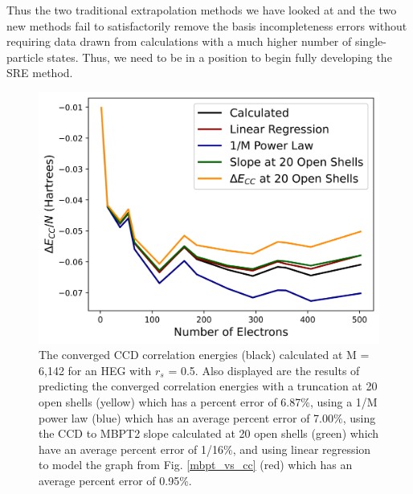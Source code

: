 
Thus the two traditional extrapolation methods we have looked at and the two new methods fail to satisfactorily remove the basis incompleteness errors without requiring data drawn from calculations with a much higher number of single-particle states. Thus, we need to be in a position to begin fully developing the SRE method.

\begin{figure}
    \centering
    \includegraphics[scale=0.75]{Images/Chapter7/ElectronGas/EG_extrapolation_compare_no_sre.png}
    \caption{The converged CCD correlation energies (black) calculated at M = 6,142 for an HEG with $r_s$ = 0.5.  Also displayed are the results of predicting the converged correlation energies with a truncation at 20 open shells (yellow) which has a percent error of 6.87$\%$, using a 1/M power law (blue) which has an average percent error of 7.00$\%$, using the CCD to MBPT2 slope calculated at 20 open shells (green) which have an average percent error of 1/16$\%$, and using linear regression to model the graph from Fig. \ref{mbpt_vs_cc} (red) which has an average percent error of 0.95$\%$.}
    \label{fig:compare_no_sre}
\end{figure}
